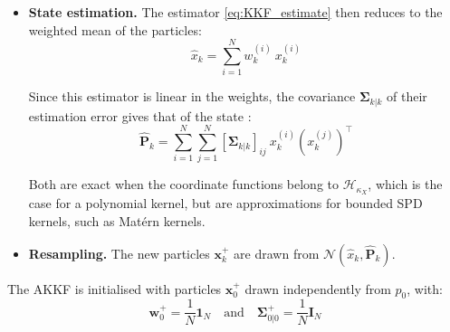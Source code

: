\begin{itemize}
	Moreover, the matrix $\mathbf{O}$ is replaced by the identity. This corresponds to an observation operator estimated without regularisation, which maps the feature of each particle to the feature of its simulated observation. The correction thus becomes:
	\begin{equation}
		\left\{\begin{aligned}
		\mathbf{K}_k&=\boldsymbol{\Sigma}_{k|k-1}\left(\mathbf{G}_k^Z\:\boldsymbol{\Sigma}_{k|k-1}+\alpha_{\mathrm{RKHS},Z}\mathbf{I}_N\right)^{-1}\\
		\mathbf{w}_k&=\mathbf{w}_{k|k-1}+\mathbf{K}_k\left(\kappa_Z\left(\mathbf{z}_k,z_k\right)-\mathbf{G}_k^Z\:\mathbf{w}_{k|k-1}\right)\\
		\boldsymbol{\Sigma}_{k|k}&=\boldsymbol{\Sigma}_{k|k-1}-\mathbf{K}_k\:\mathbf{G}_k^Z\:\boldsymbol{\Sigma}_{k|k-1}
		\end{aligned}\right.
	\end{equation}
	\item\textbf{State estimation.} The estimator \eqref{eq:KKF_estimate} then reduces to the weighted mean of the particles:
	\begin{equation}
		\hat{x}_k=\sum_{i=1}^Nw_k^{(i)}\:x_k^{(i)}
	\end{equation}

	Since this estimator is linear in the weights, the covariance $\boldsymbol{\Sigma}_{k|k}$ of their estimation error gives that of the state \cite{bib:kernel-Kalman}:
	\begin{equation}
		\hat{\mathbf{P}}_k=\sum_{i=1}^N\sum_{j=1}^N\left[\boldsymbol{\Sigma}_{k|k}\right]_{ij}\:x_k^{(i)}\left(x_k^{(j)}\right)^\top
	\end{equation}

	Both are exact when the coordinate functions belong to $\mathcal{H}_{\kappa_X}$, which is the case for a polynomial kernel, but are approximations for bounded SPD kernels, such as Matérn kernels.
	\item\textbf{Resampling.} The new particles $\mathbf{x}_k^+$ are drawn from $\mathcal{N}\left(\hat{x}_k,\hat{\mathbf{P}}_k\right)$.
\end{itemize}

The AKKF is initialised with particles $\mathbf{x}_0^+$ drawn independently from $p_0$, with:
\begin{equation}
	\mathbf{w}_0^+=\frac{1}{N}\mathbf{1}_N\quad\text{and}\quad\boldsymbol{\Sigma}_{0|0}^+=\frac{1}{N}\mathbf{I}_N
\end{equation}

